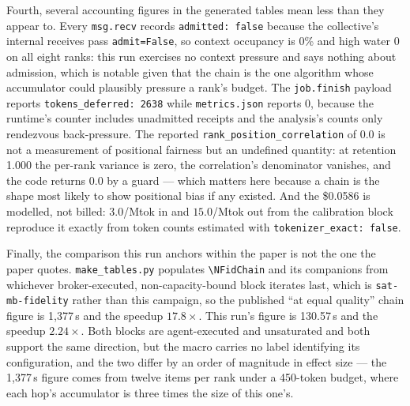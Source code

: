 \documentclass[11pt]{article}
\begin{document}
Fourth, several accounting figures in the generated tables mean less than they appear
to. Every \texttt{msg.recv} records \texttt{admitted: false} because the collective's
internal receives pass \texttt{admit=False}, so context occupancy is 0\% and high water
0 on all eight ranks: this run exercises no context pressure and says nothing about
admission, which is notable given that the chain is the one algorithm whose accumulator
could plausibly pressure a rank's budget. The \texttt{job.finish} payload reports
\texttt{tokens\_deferred: 2638} while \texttt{metrics.json} reports 0, because the
runtime's counter includes unadmitted receipts and the analysis's counts only rendezvous
back-pressure. The reported \texttt{rank\_position\_correlation} of 0.0 is not a
measurement of positional fairness but an undefined quantity: at retention 1.000 the
per-rank variance is zero, the correlation's denominator vanishes, and the code returns
0.0 by a guard --- which matters here because a chain is the shape most likely to show
positional bias if any existed. And the \$0.0586 is modelled, not billed: $3.0$/Mtok in
and $15.0$/Mtok out from the calibration block reproduce it exactly from token counts
estimated with \texttt{tokenizer\_exact: false}.

Finally, the comparison this run anchors within the paper is not the one the paper
quotes. \texttt{make\_tables.py} populates \texttt{\textbackslash NFidChain} and its
companions from whichever broker-executed, non-capacity-bound block iterates last, which
is \texttt{sat-mb-fidelity} rather than this campaign, so the published ``at equal
quality'' chain figure is 1{,}377\,s and the speedup $17.8\times$. This run's figure is
130.57\,s and the speedup $2.24\times$. Both blocks are agent-executed and unsaturated
and both support the same direction, but the macro carries no label identifying its
configuration, and the two differ by an order of magnitude in effect size --- the
1{,}377\,s figure comes from twelve items per rank under a 450-token budget, where each
hop's accumulator is three times the size of this one's.
\end{document}

